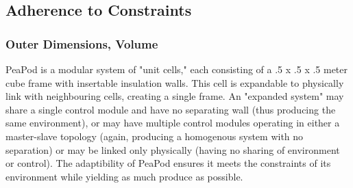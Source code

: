 \documentclass{report}
\begin{document}
\subsection{Adherence to Constraints}
\label{sec:constraints}



\subsubsection{Outer Dimensions, Volume} 
\label{sec:constraints-volume}




PeaPod is a modular system of "unit cells," each consisting of a .5 x .5 x .5 meter cube frame with insertable insulation walls. This cell is expandable to physically link with neighbouring cells, creating a single frame. An "expanded system" may share a single control module and have no separating wall (thus producing the same environment), or may have multiple control modules operating in either a master-slave topology (again, producing a homogenous system with no separation) or may be linked only physically (having no sharing of environment or control). The adaptibility of PeaPod ensures it meets the constraints of its environment while yielding as much produce as possible.

\end{document}
